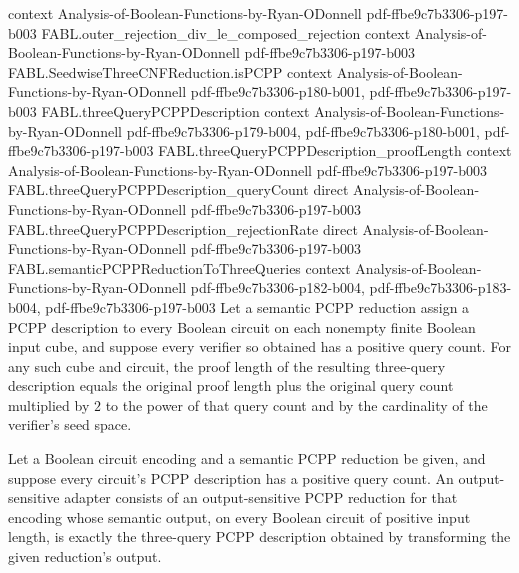 \begin{theorem}
  {context}
  {Analysis-of-Boolean-Functions-by-Ryan-ODonnell}
  {pdf-ffbe9c7b3306-p197-b003}
\proofstep
  {FABL.outer_rejection_div_le_composed_rejection}
  {context}
  {Analysis-of-Boolean-Functions-by-Ryan-ODonnell}
  {pdf-ffbe9c7b3306-p197-b003}
\proofstep
  {FABL.SeedwiseThreeCNFReduction.isPCPP}
  {context}
  {Analysis-of-Boolean-Functions-by-Ryan-ODonnell}
  {pdf-ffbe9c7b3306-p180-b001,
    pdf-ffbe9c7b3306-p197-b003}
\proofstep
  {FABL.threeQueryPCPPDescription}
  {context}
  {Analysis-of-Boolean-Functions-by-Ryan-ODonnell}
  {pdf-ffbe9c7b3306-p179-b004,
    pdf-ffbe9c7b3306-p180-b001,
    pdf-ffbe9c7b3306-p197-b003}
\proofstep
  {FABL.threeQueryPCPPDescription_proofLength}
  {context}
  {Analysis-of-Boolean-Functions-by-Ryan-ODonnell}
  {pdf-ffbe9c7b3306-p197-b003}
\proofstep
  {FABL.threeQueryPCPPDescription_queryCount}
  {direct}
  {Analysis-of-Boolean-Functions-by-Ryan-ODonnell}
  {pdf-ffbe9c7b3306-p197-b003}
\proofstep
  {FABL.threeQueryPCPPDescription_rejectionRate}
  {direct}
  {Analysis-of-Boolean-Functions-by-Ryan-ODonnell}
  {pdf-ffbe9c7b3306-p197-b003}
\proofstep
  {FABL.semanticPCPPReductionToThreeQueries}
  {context}
  {Analysis-of-Boolean-Functions-by-Ryan-ODonnell}
  {pdf-ffbe9c7b3306-p182-b004,
    pdf-ffbe9c7b3306-p183-b004,
    pdf-ffbe9c7b3306-p197-b003}
Let a semantic PCPP reduction assign a PCPP description to every Boolean circuit on each
nonempty finite Boolean input cube, and suppose every verifier so obtained has a
positive query count. For any such cube and circuit, the proof length of the resulting
three-query description equals the original proof length plus the original query count
multiplied by $2$ to the power of that query count and by the cardinality of the
verifier's seed space.
\end{theorem}

\begin{definition}
\label{FABL.ThreeQueryOutputSensitiveAdapter}
\leanok
{}
Let a Boolean circuit encoding and a semantic PCPP reduction be given, and suppose every
circuit's PCPP description has a positive query count. An output-sensitive adapter
consists of an output-sensitive PCPP reduction for that encoding whose semantic output,
on every Boolean circuit of positive input length, is exactly the three-query PCPP
description obtained by transforming the given reduction's output.
\end{definition}


